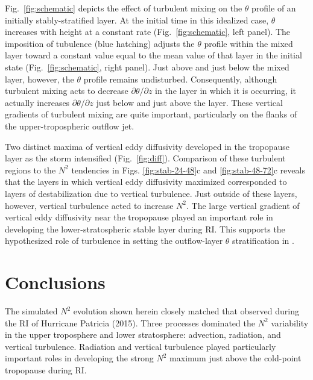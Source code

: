 \documentclass{ametsoc}
\begin{document}
Fig.~\ref{fig:schematic} depicts the effect of turbulent mixing on the $\theta$ profile of an initially stably-stratified layer.
At the initial time in this idealized case, $\theta$ increases with height at a constant rate (Fig.~\ref{fig:schematic}, left panel).
The imposition of tubulence (blue hatching) adjusts the $\theta$ profile within the mixed layer toward a constant value equal to the mean value of that layer in the initial state (Fig.~\ref{fig:schematic}, right panel).
Just above and just below the mixed layer, however, the $\theta$ profile remains undisturbed.
Consequently, although turbulent mixing acts to decrease $\partial \theta/\partial z$ in the layer in which it is occurring, it actually increases $\partial \theta/\partial z$ just below and just above the layer.
These vertical gradients of turbulent mixing are quite important, particularly on the flanks of the upper-tropospheric outflow jet.

Two distinct maxima of vertical eddy diffusivity developed in the tropopause layer as the storm intensified (Fig.~\ref{fig:diff}).
Comparison of these turbulent regions to the $N^2$ tendencies in Figs. \ref{fig:stab-24-48}c and \ref{fig:stab-48-72}c reveals that the layers in which vertical eddy diffusivity maximized corresponded to layers of destabilization due to vertical turbulence.
Just outside of these layers, however, vertical turbulence acted to increase $N^2$.
The large vertical gradient of vertical eddy diffusivity near the tropopause played an important role in developing the lower-stratospheric stable layer during RI.
This supports the hypothesized role of turbulence in setting the outflow-layer $\theta$ stratification in \cite{RotunnoEmanuel}.

  \section{Conclusions}

The simulated $N^2$ evolution shown herein closely matched that observed during the RI of Hurricane Patricia (2015).
Three processes dominated the $N^2$ variability in the upper troposphere and lower stratosphere: advection, radiation, and vertical turbulence.
Radiation and vertical turbulence played particularly important roles in developing the strong $N^2$ maximum just above the cold-point tropopause during RI.
\end{document}
